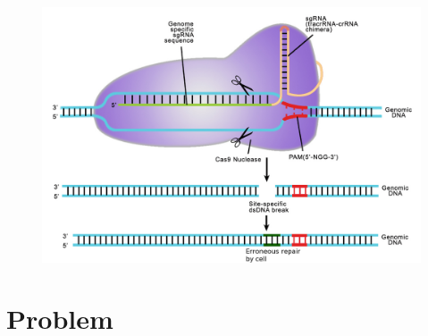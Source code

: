 \documentclass[Nike]{tuberlinbeamer}
\begin{document}

\begin{frame}
  \begin{figure}
    \includegraphics[width=0.85\linewidth,left]{Doudna-art-crop-repair.jpg}
  \end{figure}
\end{frame}


\section{Problem}

\end{document}
